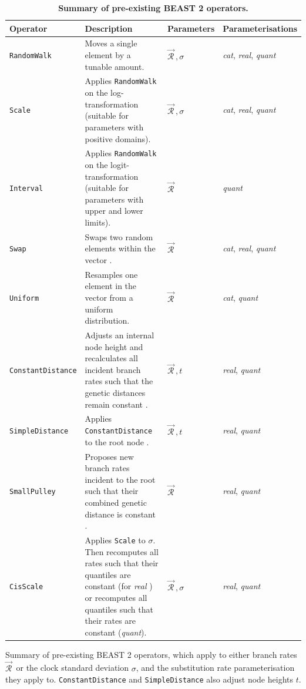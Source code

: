 \documentclass[10pt,letterpaper]{article}
\begin{document}
\begin{table}[h!]
\centering
\caption{\textbf{Summary of pre-existing BEAST 2 operators.}}
\begin{tabular}{l p{4.2cm} l l} 
 Operator & Description & Parameters & Parameterisations  \\
  \hline
 \texttt{RandomWalk} & Moves a single element by a tunable amount. & $\vec{\mathcal{R}}^{\,}, \sigma$ & \textit{cat}, \textit{real}, \textit{quant} \\
  \hline
\texttt{Scale} & Applies \texttt{RandomWalk} on the log-transformation (suitable for parameters with positive domains). & $\vec{\mathcal{R}}^{\,}, \sigma$ & \textit{cat}, \textit{real}, \textit{quant}  \\
  \hline
 \texttt{Interval} & Applies \texttt{RandomWalk} on the logit-transformation (suitable for parameters with upper and lower limits). & $\vec{\mathcal{R}}^{\,}$ & \textit{quant}  \\
  \hline
 \texttt{Swap} & Swaps two random elements within the vector \cite{drummond2006relaxed}. & $\vec{\mathcal{R}}^{\,}$  & \textit{cat}, \textit{real}, \textit{quant}  \\
 \hline
\texttt{Uniform} & Resamples one element in the vector from a uniform distribution. & $\vec{\mathcal{R}}^{\,}$  & \textit{cat}, \textit{quant}  \\
 \hline
\texttt{ConstantDistance} & Adjusts an internal node height and recalculates all incident branch rates such that the genetic distances remain constant \cite{zhang2020improving}.  & $\vec{\mathcal{R}}^{\,}, t$ & \textit{real}, \textit{quant} \\
 \hline
\texttt{SimpleDistance} & Applies \texttt{ConstantDistance} to the root node \cite{zhang2020improving}.  & $\vec{\mathcal{R}}^{\,}, t$ & \textit{real}, \textit{quant} \\
 \hline
\texttt{SmallPulley} & Proposes new branch rates incident to the root such that their combined genetic distance is constant  \cite{zhang2020improving}.  & $\vec{\mathcal{R}}^{\,}$ & \textit{real}, \textit{quant} \\
 \hline
\texttt{CisScale} & Applies \texttt{Scale} to $\sigma$. Then recomputes all rates such that their quantiles are constant (for \textit{real} \cite{zhang2020improving}) or recomputes all quantiles such that their rates are constant (\textit{quant}).  & $\vec{\mathcal{R}}^{\,}, \sigma$ & \textit{real}, \textit{quant} \\
\end{tabular}
\begin{flushleft} Summary of pre-existing BEAST 2 operators, which apply to either branch rates $\vec{\mathcal{R}}^{\,}$ or the clock standard deviation $\sigma$, and the substitution rate parameterisation they apply to.
 \texttt{ConstantDistance} and \texttt{SimpleDistance} also adjust node heights $t$.
 \end{flushleft}
\label{table:kernels}
\end{table}
\end{document}
